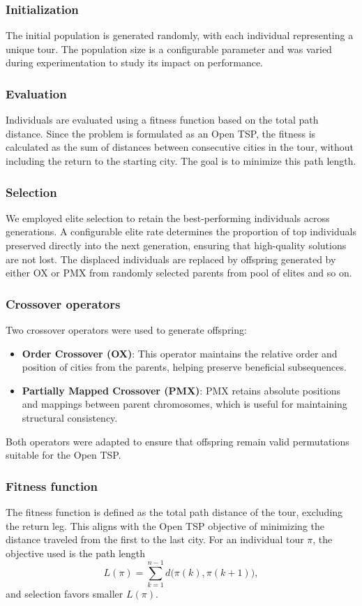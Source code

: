 \documentclass{scrartcl}
\begin{document}
\subsubsection{Initialization}
The initial population is generated randomly, with each individual representing a unique tour. The population size is a configurable parameter and was varied during experimentation to study its impact on performance.
\subsubsection{Evaluation}
Individuals are evaluated using a fitness function based on the total path distance. Since the problem is formulated as an Open TSP, the fitness is calculated as the sum of distances between consecutive cities in the tour, without including the return to the starting city. The goal is to minimize this path length.

\subsubsection{Selection}
We employed elite selection to retain the best-performing individuals across generations. A configurable elite rate determines the proportion of top individuals preserved directly into the next generation, ensuring that high-quality solutions are not lost. The displaced individuals are replaced by offspring generated by either OX or PMX from randomly selected parents from pool of elites and so on. 

\subsubsection{Crossover operators}
Two crossover operators were used to generate offspring:
\begin{itemize}
  \item \textbf{Order Crossover (OX)}: This operator maintains the relative order and position of cities from the parents, helping preserve beneficial subsequences.
  \item \textbf{Partially Mapped Crossover (PMX)}: PMX retains absolute positions and mappings between parent chromosomes, which is useful for maintaining structural consistency.
\end{itemize}
Both operators were adapted to ensure that offspring remain valid permutations suitable for the Open TSP.

\subsubsection{Fitness function}
The fitness function is defined as the total path distance of the tour, excluding the return leg. This aligns with the Open TSP objective of minimizing the distance traveled from the first to the last city.
For an individual tour \(\pi\), the objective used is the path length
\[
L(\pi)=\sum_{k=1}^{n-1} d\bigl(\pi(k),\pi(k+1)\bigr),
\]
and selection favors smaller \(L(\pi)\).
\end{document}
